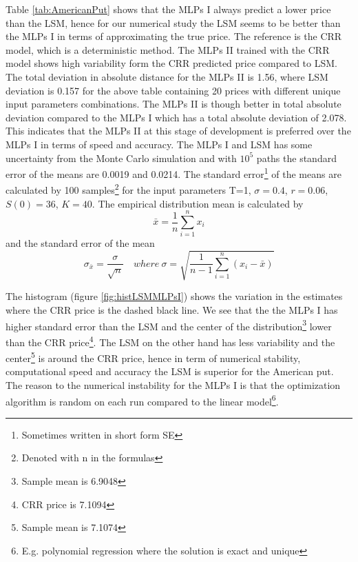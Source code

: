 Table \ref{tab:AmericanPut} shows that the MLPs I always predict a lower price than the LSM, hence for our numerical study the LSM seems to be better than the MLPs I in terms of approximating the true price. The reference is the CRR model, which is a deterministic method. The MLPs II trained with the CRR model shows high variability form the CRR predicted price compared to LSM. The total deviation in absolute distance for the MLPs II is 1.56, where LSM deviation is 0.157 for the above table containing 20 prices with different unique input parameters combinations. The MLPs II is though better in total absolute deviation compared to the MLPs I which has a total absolute deviation of 2.078. This indicates that the MLPs II at this stage of development is preferred over the MLPs I in terms of speed and accuracy. The MLPs I and LSM has some uncertainty from the Monte Carlo simulation and with $10^5$ paths the standard error of the means are 0.0019 and 0.0214. The standard error\footnote{Sometimes written in short form SE} of the means are calculated by 100 samples\footnote{Denoted with n in the formulas} for the input parameters T=1, $\sigma=0.4$, $r=0.06$, $S(0)=36$, $K=40$. The empirical distribution mean is calculated by
$$\bar{x}= \frac{1}{n}\sum_{i=1}^{n} x_i$$
and the standard error of the mean
$$\sigma_{\bar{x}}= \frac{\sigma}{\sqrt{n}} \quad where \ \sigma=\sqrt{\frac{1}{n-1}\sum_{i=1}^{n} (x_i-\bar{x})}$$
 
The histogram (figure \ref{fig:histLSMMLPsI}) shows the variation in the estimates where the CRR price is the dashed black line. We see that the the MLPs I has higher standard error than the LSM and the center of the distribution\footnote{Sample mean is 6.9048} lower than the CRR price\footnote{CRR price is 7.1094}. The LSM on the other hand has less variability and the center\footnote{Sample mean is 7.1074} is around the CRR price, hence in term of numerical stability, computational speed and accuracy the LSM is superior for the American put. The reason to the numerical instability for the MLPs I is that the optimization algorithm is random on each run compared to the linear model\footnote{E.g. polynomial regression where the solution is exact and unique}.\\

